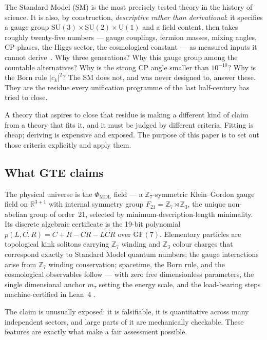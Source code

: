\documentclass[11pt]{article}
\newcommand{\PHIMDL}{\ensuremath{\Phi_{\mathrm{MDL}}}}
\newcommand{\ZS}{\ensuremath{\mathbb{Z}_7}}
\newcommand{\GF}[1]{\ensuremath{\mathrm{GF}(#1)}}
\newcommand{\poly}{\ensuremath{p(L,C,R)}}
\begin{document}
The Standard Model (SM) is the most precisely tested theory in the history of
science.  It is also, by construction, \emph{descriptive rather than
derivational}: it specifies a gauge group
$\mathrm{SU}(3)\times\mathrm{SU}(2)\times\mathrm{U}(1)$ and a field content, then
takes roughly twenty-five numbers --- gauge couplings, fermion masses, mixing
angles, CP phases, the Higgs sector, the cosmological constant --- as measured
inputs it cannot derive~\cite{ParticleDataGroup2024}.  Why three generations?  Why
this gauge group among the countable alternatives?  Why is the strong CP angle
smaller than $10^{-10}$?  Why is the Born rule $|c_k|^2$?  The SM does not, and
was never designed to, answer these.  They are the residue every unification
programme of the last half-century has tried to close.

A theory that aspires to close that residue is making a different kind of claim
from a theory that fits it, and it must be judged by different criteria.  Fitting
is cheap; deriving is expensive and exposed.  The purpose of this paper is to set
out those criteria explicitly and apply them.

\subsection{What GTE claims}

\begin{tcolorbox}[colback=green!5,colframe=green!50!black,
  title={The Central Claim Under Assessment}]
The physical universe is the $\PHIMDL$ field --- a $\ZS$-symmetric Klein--Gordon
gauge field on $\mathbb{R}^{3+1}$ with internal symmetry group
$F_{21} = \mathbb{Z}_7\rtimes\mathbb{Z}_3$, the unique non-abelian group of
order~21, selected by minimum-description-length minimality.  Its discrete
algebraic certificate is the 19-bit polynomial $\poly = C+R-CR-LCR$ over $\GF{7}$.
Elementary particles are topological kink solitons carrying $\mathbb{Z}_7$ winding
and $\mathbb{Z}_3$ colour charges that correspond exactly to Standard Model
quantum numbers; the gauge interactions arise from $\mathbb{Z}_7$ winding
conservation; spacetime, the Born rule, and the cosmological observables follow ---
with zero free dimensionless parameters, the single dimensional anchor $m_\tau$
setting the energy scale, and the load-bearing steps machine-certified in Lean~4
\cite{SpivackGTECompleteFramework}.
\end{tcolorbox}

The claim is unusually exposed: it is falsifiable, it is quantitative across many
independent sectors, and large parts of it are mechanically checkable.  These
features are exactly what make a fair assessment possible.
\end{document}
